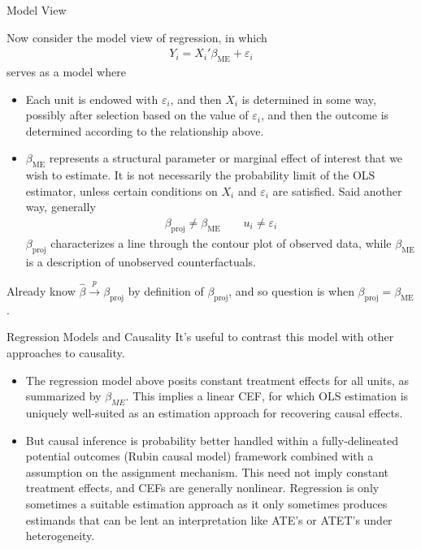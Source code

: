 \documentclass[aspectratio=169, handout]{beamer}
\newcommand{\pto}{\xrightarrow{p}}
\begin{document}
{\footnotesize
\begin{frame}{Model View}

Now consider the model view of regression, in which
\begin{align*}
  Y_i = X_i'\beta_{\text{ME}} + \varepsilon_i
\end{align*}
serves as a model where
\begin{itemize}
  \item Each unit is endowed with $\varepsilon_i$, and then $X_i$ is
    determined in some way, possibly after \alert{selection} based on
    the value of $\varepsilon_i$, and then the outcome is determined
    according to the relationship above.
  \item $\beta_{\text{ME}}$ represents a \alert{structural parameter} or
    marginal effect of interest that we wish to estimate.
    It is \alert{not} necessarily the probability limit of the OLS
    estimator, unless certain conditions on $X_i$ and $\varepsilon_i$
    are satisfied.
    Said another way, generally
    \begin{align*}
      \beta_{\text{proj}}
      \neq
      \beta_{\text{ME}}
      \qquad
      u_i \neq \varepsilon_i
    \end{align*}
    $\beta_{\text{proj}}$ characterizes a line through the contour plot
    of observed data, while $\beta_{\text{ME}}$ is a description of
    unobserved counterfactuals.
\end{itemize}
Already know $\hat{\beta}\pto \beta_{\text{proj}}$
\alert{by definition} of $\beta_{\text{proj}}$, and so question is
when $\beta_{\text{proj}}=\beta_{\text{ME}}$.
\end{frame}
}


{\footnotesize
\begin{frame}{Regression Models and Causality}
It's useful to contrast this model with other approaches to causality.
\begin{itemize}
  \item The regression model above posits \alert{constant} treatment
    effects for all units, as summarized by $\beta_{ME}$.
    This implies a linear CEF, for which OLS estimation is uniquely
    well-suited as an estimation approach for recovering causal effects.

  \item But causal inference is probability better handled within a
    fully-delineated \alert{potential outcomes} (Rubin causal model)
    framework combined with a assumption on the assignment mechanism.
    This need not imply constant treatment effects, and CEFs are
    generally nonlinear.
    Regression is \alert{only sometimes} a suitable estimation approach
    as it only sometimes produces estimands that can be lent an
    interpretation like ATE's or ATET's under heterogeneity.
\end{itemize}
\end{frame}
}
\end{document}
